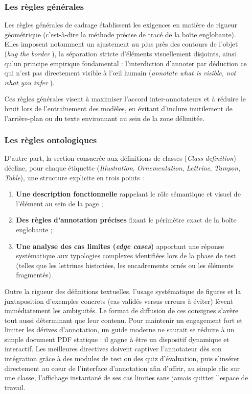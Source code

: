 \subsubsection{Les règles générales}

Les règles générales de cadrage établissent les exigences en matière de rigueur géométrique (c'est-à-dire la méthode précise de tracé de la boîte englobante). Elles imposent notamment un ajustement au plus près des contours de l'objet (\og \textit{hug the border} \fg), la séparation stricte d'éléments visuellement disjoints, ainsi qu'un principe empirique fondamental : l'interdiction d'annoter par déduction ce qui n'est pas directement visible à l'œil humain (\og \textit{annotate what is visible, not what you infer} \fg).

Ces règles générales visent à maximiser l'accord inter-annotateurs et à réduire le bruit lors de l'entraînement des modèles, en évitant d'inclure inutilement de l'arrière-plan ou du texte environnant au sein de la zone délimitée.

\subsubsection{Les règles ontologiques}

D'autre part, la section consacrée aux définitions de classes (\textit{Class definition}) décline, pour chaque étiquette (\textit{Illustration}, \textit{Ornementation}, \textit{Lettrine}, \textit{Tampon}, \textit{Table}), une structure explicite en trois points :

\begin{enumerate}
	\item \textbf{Une description fonctionnelle} rappelant le rôle sémantique et visuel de l'élément au sein de la page ;
	\item \textbf{Des règles d'annotation précises} fixant le périmètre exact de la boîte englobante ;
	\item \textbf{Une analyse des cas limites (\textit{edge cases})} apportant une réponse systématique aux typologies complexes identifiées lors de la phase de test (telles que les lettrines historiées, les encadrements ornés ou les éléments fragmentés).
\end{enumerate}

Outre la rigueur des définitions textuelles, l'usage systématique de figures et la juxtaposition d'exemples concrets (cas validés versus erreurs à éviter) lèvent immédiatement les ambiguïtés. Le format de diffusion de ces consignes s'avère tout aussi déterminant que leur contenu. Pour maintenir un engagement fort et limiter les dérives d'annotation, un guide moderne ne saurait se réduire à un simple document PDF statique : il gagne à être un dispositif dynamique et interactif. Les meilleures directives doivent \og captiver \fg{} l'annotateur dès son intégration grâce à des modules de test ou des quiz d'évaluation, puis s'insérer directement au cœur de l'interface d'annotation afin d'offrir, au simple clic sur une classe, l'affichage instantané de ses cas limites sans jamais quitter l'espace de travail.





